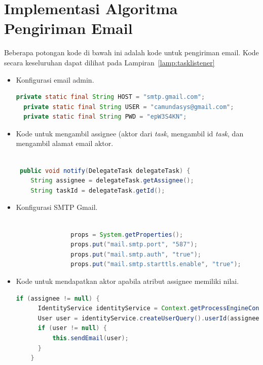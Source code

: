 \section{Implementasi Algoritma Pengiriman Email}
\label{implementasialgo}
Beberapa potongan kode di bawah ini adalah kode untuk pengiriman email. Kode secara keseluruhan dapat dilihat pada Lampiran~\ref{lamp:tasklistener}
\begin{itemize}
	\item Konfigurasi email admin.
\begin{lstlisting}[language=Java,basicstyle=\tiny,caption=TaskAssignmentListener.java]
  private static final String HOST = "smtp.gmail.com";
  private static final String USER = "camundasys@gmail.com";
  private static final String PWD = "epW3S4KN";
\end{lstlisting}
	

	\item Kode untuk mengambil assignee (aktor dari \textit{task}, mengambil id \textit{task}, dan mengambil alamat email aktor.
	\begin{lstlisting}[language=Java,basicstyle=\tiny,caption=TaskAssignmentListener.java]

 public void notify(DelegateTask delegateTask) {
    String assignee = delegateTask.getAssignee();
    String taskId = delegateTask.getId();
\end{lstlisting}

	\item Konfigurasi SMTP Gmail.
	\begin{lstlisting}[language=Java,basicstyle=\tiny,caption=TaskAssignmentListener.java]

               props = System.getProperties();
               props.put("mail.smtp.port", "587");
               props.put("mail.smtp.auth", "true");
               props.put("mail.smtp.starttls.enable", "true");

\end{lstlisting}
	\item Kode untuk mendapatkan aktor apabila atribut assignee memiliki nilai.
	\begin{lstlisting}[language=Java,basicstyle=\tiny,caption =TaskAssignmentListener.java]
	if (assignee != null) {
      IdentityService identityService = Context.getProcessEngineConfiguration().getIdentityService();
      User user = identityService.createUserQuery().userId(assignee).singleResult();
      if (user != null) {
    	  this.sendEmail(user);
      }
    }
	\end{lstlisting}
	

\end{itemize}
